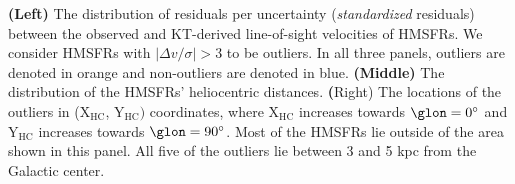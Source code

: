 \label{fig:outliers}
\textbf{(Left)} The distribution of residuals per uncertainty (\textit{standardized} residuals) between the observed and KT-derived line-of-sight velocities of HMSFRs. We consider HMSFRs with $\vert \Delta v / \sigma \vert > 3$ to be outliers. In all three panels, outliers are denoted in orange and non-outliers are denoted in blue. \textbf{(Middle)} The distribution of the HMSFRs' heliocentric distances. \textbf({Right}) The locations of the outliers in ($\mathrm{X_{HC}}$, $\mathrm{Y_{HC}})$ coordinates, where $\mathrm{X_{HC}}$ increases towards $\glon=0^\circ$ and $\mathrm{Y_{HC}}$ increases towards $\glon=90^\circ$. Most of the HMSFRs lie outside of the area shown in this panel. All five of the outliers lie between 3 and 5 kpc from the Galactic center.